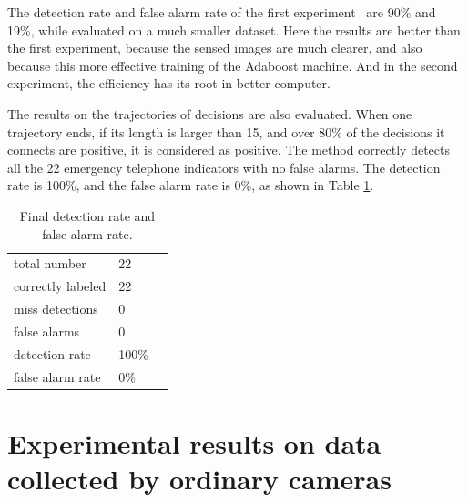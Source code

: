 The detection rate and false alarm rate of the first experiment~\citep{wang1} are 90\% and 19\%, while evaluated on a much smaller dataset. Here the results are better than the first experiment, because the sensed images are much clearer, and also because this more effective training of the Adaboost machine. And in the second experiment, the efficiency has its root in better computer.

The results on the trajectories of decisions are also evaluated. When one trajectory ends, if its length is larger than 15, and over 80\% of the decisions it connects are positive, it is considered as positive. The method correctly detects all the 22 emergency telephone indicators with no false alarms. The detection rate is 100\%, and the false alarm rate is 0\%, as shown in Table \ref{tb:tb3}.

\begin{table}[h]
\centering
\begin{tabular}{lll}
     \hline
     \hline
    total number & 22  \\
    correctly labeled &	22   \\
    miss detections &	0 &	  \\
    false alarms &	0    \\
    detection rate &	100\% &	  \\
    false alarm rate &	0\% &	   \\
   \hline
\end{tabular}
\caption[Final detection rate and false alarm rate]{Final detection rate and false alarm rate.}\label{tb:tb3}
\end{table}

\section{Experimental results on data collected by ordinary cameras}
\label{ord}




